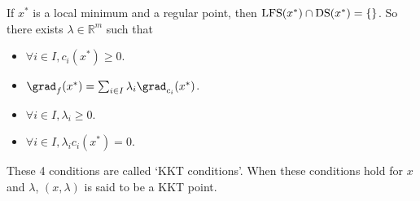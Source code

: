 If $x^*$ is a local minimum and a regular point, then $\operatorname{LFS}(x^*) \cap \operatorname{DS}(x^*) = \{\}$.
So there exists $\lambda \in \mathbb{R}^m$ such that
\begin{itemize}
\item $\forall i \in I, c_i(x^*) \ge 0$.
\item $\grad_f(x^*) = \sum_{i \in I} \lambda_i\grad_{c_i}(x^*)$.
\item $\forall i \in I, \lambda_i \ge 0$.
\item $\forall i \in I, \lambda_ic_i(x^*) = 0$.
\end{itemize}
These 4 conditions are called `KKT conditions'.
When these conditions hold for $x$ and $\lambda$, $(x, \lambda)$ is said to be a KKT point.


